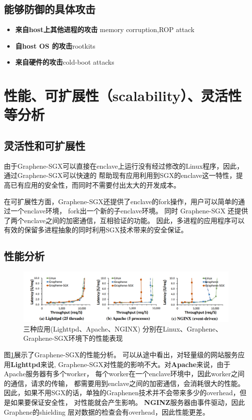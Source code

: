 \subsection{能够防御的具体攻击}
\begin{itemize}
    \item [1)]\textbf{来自host上其他进程的攻击} memory corruption,ROP attack
    \item [2)]\textbf{自host OS 的攻击}rootkits
    \item [3)]\textbf{来自硬件的攻击}cold-boot attacks
\end{itemize}

\section{性能、可扩展性（scalability）、灵活性等分析}
\subsection{灵活性和可扩展性}
由于Graphene-SGX可以直接在enclave上运行没有经过修改的Linux程序，因此，通过Graphene-SGX可以快速的
帮助现有应用利用到SGX的enclave这一特性，提高已有应用的安全性，而同时不需要付出太大的开发成本。

在可扩展性方面，Graphene-SGX还提供了enclave的fork操作，用户可以简单的通过一个enclave环境，
fork出一个新的子enclave环境。
同时 Graphene-SGX 还提供了两个enclave之间的加密通信，互相验证的功能。
因此，多进程的应用程序可以有效的保留多进程抽象的同时利用SGX技术带来的安全保证。


\subsection{性能分析}
\begin{figure}[]
    \centering
    \includegraphics[width=1\textwidth]{1.png}    
    \caption{三种应用(Lighttpd、Apache、NGINX)
    分别在Linux、Graphene、Graphene-SGX环境下的性能表现}
    \label{23333}
\end{figure}
图\ref{23333}展示了Graphene-SGX的性能分析。
可以从途中看出，对轻量级的网站服务应用\textbf{Lighttpd}来说,
Graphene-SGX对性能的影响不大。对\textbf{Apache}来说，由于Apache服务器有多个worker，
每个worker在一个enclave环境中，因此worker之间的通信，请求的传输，
都需要用到enclave之间的加密通信，会消耗很大的性能。
因此，如果不用SGX的话，单独的Graphenen技术并不会带来多少的overhead，但是如果要保证安全性，
对性能就会产生影响。
\textbf{NGINZ}服务器由事件驱动，因此Graphene的shielding 层对数据的检查会有overhead，因此性能更差。

